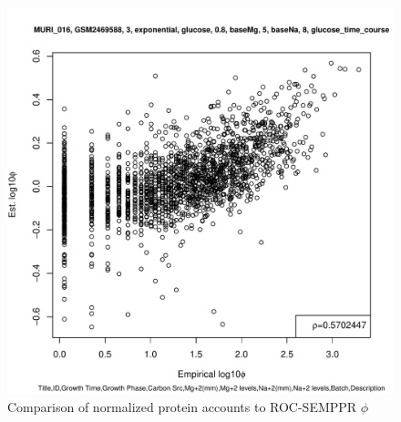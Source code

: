 \documentclass[11pt]{labbook}
\begin{document}
\begin{figure}[H]
\centering
\includegraphics[page=1,scale=0.6]{Ecoli_REL606/GSE94117_norm_sf_protein.pdf}
\caption{Comparison of normalized protein accounts to ROC-SEMPPR $\phi$}
\end{figure}


{}
\end{document}

